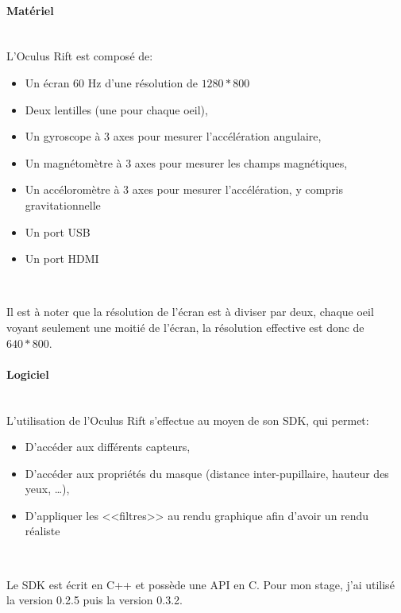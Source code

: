 \documentclass[a4paper,french,12pt]{article}
\begin{document}
			\paragraph{Matériel} ~\\
		    
				L'Oculus Rift est composé de:\\
			      
				\begin{itemize}
				\item Un écran 60 Hz d'une résolution de $1280*800$
				\item Deux lentilles (une pour chaque oeil),
				\item Un gyroscope à 3 axes pour mesurer l'accélération angulaire,
				\item Un magnétomètre à 3 axes pour mesurer les champs magnétiques,
				\item Un accéloromètre à 3 axes pour mesurer l'accélération, y compris gravitationnelle
				\item Un port USB
				\item Un port HDMI
				\end{itemize} ~
			      
				Il est à noter que la résolution de l'écran est à diviser par deux, chaque oeil voyant seulement
				une moitié de l'écran, la résolution effective est donc de $640*800$.
		    
			\paragraph{Logiciel} ~\\
			  
			    L'utilisation de l'Oculus Rift s'effectue au moyen de son SDK, qui permet:\\
			    
			    \begin{itemize}
			    \item D'accéder aux différents capteurs,
			    \item D'accéder aux propriétés du masque (distance inter-pupillaire, hauteur des yeux, \ldots),
			    \item D'appliquer les <<filtres>> au rendu graphique afin d'avoir un rendu réaliste
			    \end{itemize} ~
			    
			    Le SDK est écrit en C++ et possède une API en C.
			    Pour mon stage, j'ai utilisé la version 0.2.5 puis la version 0.3.2.
			
\end{document}
